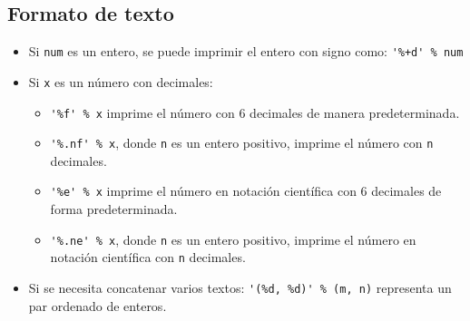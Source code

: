\documentclass[12pt]{article}
\theoremstyle{definition}
\begin{document}
\subsection{Formato de texto}

\begin{itemize}
  \item Si \verb|num| es un entero, se puede imprimir el entero con signo como: \verb|'%+d' % num|
  \item Si \verb|x| es un número con decimales:
    \begin{itemize}
      \item \verb|'%f' % x| imprime el número con 6 decimales de manera predeterminada.
      \item \verb|'%.nf' % x|, donde \verb|n| es un entero positivo, imprime el número con \verb|n| decimales.
      \item \verb|'%e' % x| imprime el número en notación científica con 6 decimales de forma predeterminada.
      \item \verb|'%.ne' % x|, donde \verb|n| es un entero positivo, imprime el número en notación científica con \verb|n| decimales.
    \end{itemize}
  \item Si se necesita concatenar varios textos: \verb|'(%d, %d)' % (m, n)| representa un par ordenado de enteros.
\end{itemize}
\end{document}
